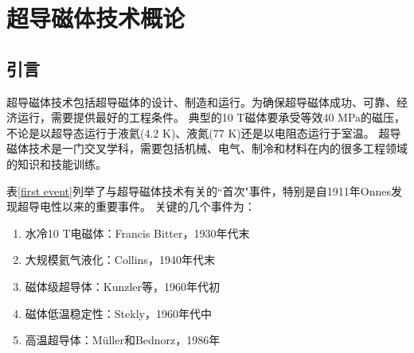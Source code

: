 \chapter{超导磁体技术概论}
\section{引言}
超导磁体技术包括超导磁体的设计、制造和运行。为确保超导磁体成功、可靠、经济运行，需要提供最好的工程条件。
典型的10 T磁体要承受等效40 MPa的磁压，不论是以超导态运行于液氦(4.2 K)、液氮(77 K)还是以电阻态运行于室温。
超导磁体技术是一门交叉学科，需要包括机械、电气、制冷和材料在内的很多工程领域的知识和技能训练。

表\ref{first event}列举了与超导磁体技术有关的``首次"事件，特别是自1911年Onnes发现超导电性以来的重要事件。
关键的几个事件为：
\begin{enumerate}
  \item 水冷10 T电磁体：Francis Bitter，1930年代末
  \item 大规模氦气液化：Collins，1940年代末
  \item 磁体级超导体：Kunzler等，1960年代初
  \item 磁体低温稳定性：Stekly，1960年代中
  \item 高温超导体：Müller和Bednorz，1986年
\end{enumerate}

